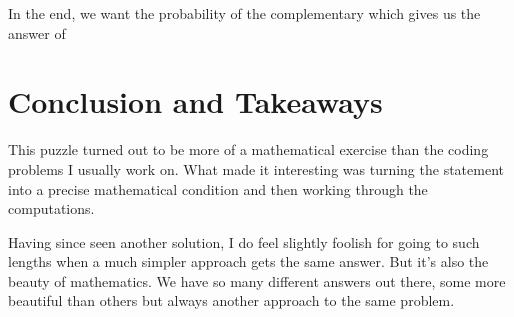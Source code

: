 \documentclass[11pt,a4paper]{article}
\theoremstyle{plain}
\theoremstyle{remark}
\begin{document}
In the end, we want the probability of the complementary which gives us the answer of 

\begin{center}
\end{center}

\newpage

\section*{Conclusion and Takeaways}

This puzzle turned out to be more of a mathematical exercise than the coding problems I usually work on. What made it interesting was turning the statement into a precise mathematical condition and then working through the computations.

Having since seen another solution, I do feel slightly foolish for going to such lengths when a much simpler approach gets the same answer. But it's also the beauty of mathematics. We have so many different answers out there, some more beautiful than others but always another approach to the same problem.
\end{document}
